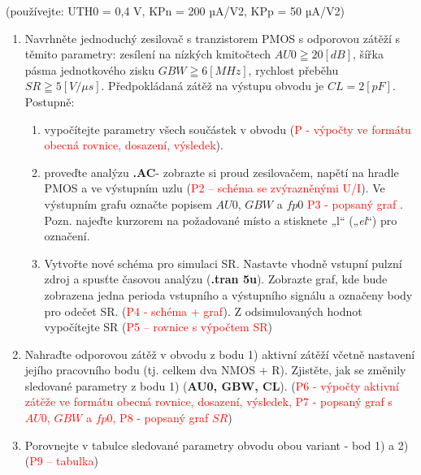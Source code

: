(používejte: UTH0 = 0,4 V, KPn = 200 µA/V2, KPp = 50 µA/V2)

\begin{enumerate}
    \item Navrhněte jednoduchý zesilovač s tranzistorem PMOS s odporovou zátěží s těmito parametry: 
    zesílení na nízkých kmitočtech \(AU0 \geqq  20 [dB]\), šířka pásma jednotkového zisku \(GBW \geqq 6 [MHz]\), rychlost přeběhu \(SR \geqq 5 [V/\mu s]\). Předpokládaná zátěž na výstupu obvodu je \(CL = 2 [pF]\). Postupně:    
    \begin{enumerate}
        \item vypočítejte parametry všech součástek v obvodu (\textcolor{red}{P - výpočty ve formátu obecná rovnice, dosazení, výsledek}).
        \item proveďte analýzu {\bf .AC}- zobrazte si proud zesilovačem, napětí na hradle PMOS a ve výstupním uzlu  (\textcolor{red}{P2 – schéma se zvýrazněnými U/I}). Ve výstupním grafu označte popisem \(AU0\), \(GBW\) a \(fp0\) {\textcolor{red}{P3 - popsaný graf}} . Pozn. najeďte kurzorem na požadované místo a stisknete „l“ („{\it el}“) pro označení.
        \item Vytvořte nové schéma pro simulaci SR. Nastavte vhodně vstupní pulzní zdroj a spusťte časovou analýzu ({\bf .tran 5u}). Zobrazte graf, kde bude zobrazena jedna perioda vstupního a výstupního signálu a označeny body pro odečet SR. 
        (\textcolor{red}{P4 - schéma + graf}). Z odsimulovaných hodnot vypočítejte SR (\textcolor{red}{P5 – rovnice s výpočtem SR})
    \end{enumerate}
    \item Nahraďte odporovou zátěž v obvodu z bodu 1) aktivní zátěží včetně nastavení jejího pracovního bodu (tj. celkem dva NMOS + R). 
    Zjistěte, jak se změnily sledované parametry z bodu 1) ({\bf AU0, GBW, CL}). (\textcolor{red}{P6 - výpočty aktivní zátěže ve formátu obecná rovnice, dosazení, výsledek, P7 - popsaný graf s \(AU0\), \(GBW\) a \(fp0\), P8 - popsaný graf \(SR\)})
    \item Porovnejte v tabulce sledované parametry obvodu obou variant - bod 1) a 2) (\textcolor{red}{P9 – tabulka}) 
\end{enumerate}
